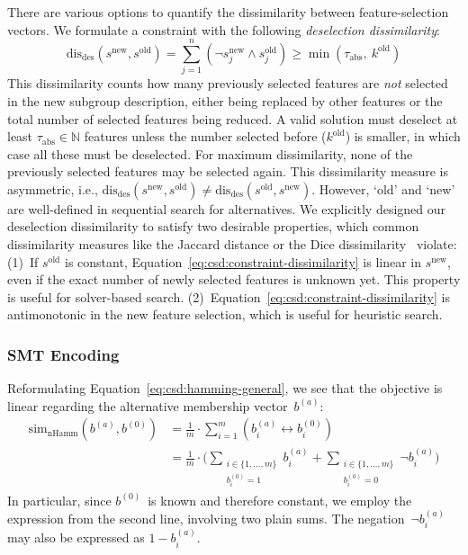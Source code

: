 \documentclass[acmsmall]{acmart} %
\theoremstyle{acmplain}
\theoremstyle{acmdefinition}
\begin{document}
There are various options to quantify the dissimilarity between feature-selection vectors.
We formulate a constraint with the following \emph{deselection dissimilarity}:
%
\begin{equation}
	\text{dis}_{\text{des}}(s^{\text{new}}, s^{\text{old}}) = \sum_{j=1}^n (\lnot s^{\text{new}}_j \land s^{\text{old}}_j) \geq \min \left( \tau_{\text{abs}},~k^{\text{old}} \right)
	\label{eq:csd:constraint-dissimilarity}
\end{equation}
%
This dissimilarity counts how many previously selected features are \emph{not} selected in the new subgroup description, either being replaced by other features or the total number of selected features being reduced.
A valid solution must deselect at least $\tau_{\text{abs}} \in \mathbb{N}$ features unless the number selected before ($k^{\text{old}}$) is smaller, in which case all these must be deselected.
For maximum dissimilarity, none of the previously selected features may be selected again.
This dissimilarity measure is asymmetric, i.e., $\text{dis}_{\text{des}}(s^{\text{new}}, s^{\text{old}}) \neq \text{dis}_{\text{des}}(s^{\text{old}}, s^{\text{new}})$.
However, `old' and `new' are well-defined in sequential search for alternatives.
We explicitly designed our deselection dissimilarity to satisfy two desirable properties, which common dissimilarity measures like the Jaccard distance or the Dice dissimilarity~\cite{choi2010survey} violate:
(1)~If $s^{\text{old}}$ is constant, Equation~\ref{eq:csd:constraint-dissimilarity} is linear in $s^{\text{new}}$, even if the exact number of newly selected features is unknown yet.
This property is useful for solver-based search.
(2)~Equation~\ref{eq:csd:constraint-dissimilarity} is antimonotonic in the new feature selection, which is useful for heuristic search.

\subsubsection{SMT Encoding}
\label{sec:csd:approach:alternatives:smt}

Reformulating Equation~\ref{eq:csd:hamming-general}, we see that the objective is linear regarding the alternative membership vector~$b^{(a)}$:
%
\begin{equation}
	\begin{aligned}
		\text{sim}_{\text{nHamm}}(b^{(a)}, b^{(0)}) &= \frac{1}{m} \cdot \sum_{i=1}^m \left( b_i^{(a)} \leftrightarrow b_i^{(0)} \right) \\
		&= \frac{1}{m} \cdot \Big( \sum\limits_{\substack{i \in \{1, \dots, m\} \\ b_i^{(0)} = 1}} b_i^{(a)} + \sum\limits_{\substack{i \in \{1, \dots, m\} \\ b_i^{(0)} = 0}} \lnot b_i^{(a)} \Big)
	\end{aligned}
	\label{eq:csd:smt-hamming}
\end{equation}
%
In particular, since $b^{(0)}$~is known and therefore constant, we employ the expression from the second line, involving two plain sums.
The negation~$\lnot b_i^{(a)}$ may also be expressed as $1 - b_i^{(a)}$.
\end{document}
